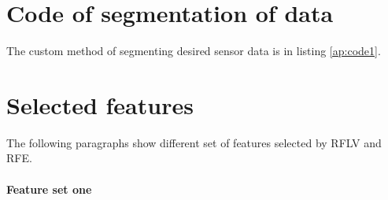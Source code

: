 \documentclass[USenglish]{ifimaster}  %
\begin{document}
\chapter{Code of segmentation of data} \label{ap:code}
The custom method of segmenting desired sensor data is in listing \ref{ap:code1}.

\chapter{Selected features} \label{ap:self}
The following paragraphs show different set of features selected by RFLV and RFE.

\subsubsection{Feature set one}
\end{document}
